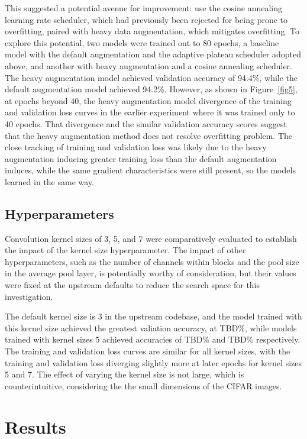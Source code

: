 \documentclass[letterpaper]{article} %
\begin{document}
This suggested a potential avenue for improvement: use the cosine annealing learning rate scheduler,
which had previously been rejected for being prone to overfitting, paired with heavy
data augmentation, which mitigates overfitting.
To explore this potential, two models were trained out to 80 epochs, a baseline model with the
default augmentation and the adaptive plateau scheduler adopted above, and another with
heavy augmentation and a cosine annealing scheduler.
The heavy augmentation model achieved validation accuracy of 94.4\%, while the default
augmentation model achieved 94.2\%.
However, as shown in Figure~\ref{fig5}, at epochs beyond 40, the heavy augmentation
model divergence of the training and validation loss curves in the earlier experiment
where it was trained only to 40 epochs.
That divergence and the similar validation accuracy scores suggest that the heavy augmentation
method does not resolve overfitting problem.
The close tracking of training and validation loss was likely due to the heavy
augmentation inducing greater training loss than the default augmentation induces,
while the same gradient characteristics were still present, so the models learned
in the same way.

\subsection{Hyperparameters}

Convolution kernel sizes of 3, 5, and 7 were comparatively evaluated to establish the impact of the
kernel size hyperparameter.
The impact of other hyperparameters, such as the number of channels within blocks and the pool size in the average pool
layer, is potentially worthy of consideration, but their values were fixed at the upstream defaults to reduce the
search space for this investigation.

The default kernel size is 3 in the upstream codebase, and the model trained with this kernel size achieved the
greatest valiation accuracy, at TBD\%, while models trained with kernel sizes 5 achieved accuracies
of TBD\% and TBD\% respectively.
The training and validation loss curves are similar for all kernel sizes, with the training and validation
loss diverging slightly more at later epochs for kernel sizes 5 and 7.
The effect of varying the kernel size is not large, which is counterintuitive, considering the
the small dimensions of the CIFAR images.

\section{Results}
\end{document}
